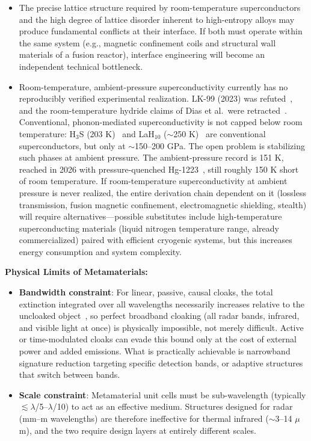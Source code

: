 \documentclass[aps,prd,twocolumn,superscriptaddress,nofootinbib]{revtex4-2}
\begin{document}
\begin{itemize}
  \item The precise lattice structure required by room-temperature superconductors and the high degree of lattice disorder inherent to high-entropy alloys may produce fundamental conflicts at their interface. If both must operate within the same system (e.g., magnetic confinement coils and structural wall materials of a fusion reactor), interface engineering will become an independent technical bottleneck.
  \item Room-temperature, ambient-pressure superconductivity currently has no reproducibly verified experimental realization. LK-99 (2023) was refuted~\cite{Garisto2023}, and the room-temperature hydride claims of Dias et al.\ were retracted~\cite{Snider2022,DasenbrockGammon2023}. Conventional, phonon-mediated superconductivity is not capped below room temperature: H$_{3}$S (203 K)~\cite{Drozdov2015} and LaH$_{10}$ (${\sim}$250 K)~\cite{Drozdov2019} are conventional superconductors, but only at ${\sim}$150--200 GPa. The open problem is stabilizing such phases at ambient pressure. The ambient-pressure record is 151 K, reached in 2026 with pressure-quenched Hg-1223~\cite{Deng2026}, still roughly 150 K short of room temperature. If room-temperature superconductivity at ambient pressure is never realized, the entire derivation chain dependent on it (lossless transmission, fusion magnetic confinement, electromagnetic shielding, stealth) will require alternatives---possible substitutes include high-temperature superconducting materials (liquid nitrogen temperature range, already commercialized) paired with efficient cryogenic systems, but this increases energy consumption and system complexity.
\end{itemize}

\textbf{Physical Limits of Metamaterials:}

\begin{itemize}
  \item \textbf{Bandwidth constraint}: For linear, passive, causal cloaks, the total extinction integrated over all wavelengths necessarily increases relative to the uncloaked object~\cite{Monticone2013}, so perfect broadband cloaking (all radar bands, infrared, and visible light at once) is physically impossible, not merely difficult. Active or time-modulated cloaks can evade this bound only at the cost of external power and added emissions. What is practically achievable is narrowband signature reduction targeting specific detection bands, or adaptive structures that switch between bands.
  \item \textbf{Scale constraint}: Metamaterial unit cells must be sub-wavelength (typically $\lesssim\lambda$/5--$\lambda$/10) to act as an effective medium. Structures designed for radar (mm--m wavelengths) are therefore ineffective for thermal infrared (${\sim}$3--14 $\mu$m), and the two require design layers at entirely different scales.
\end{itemize}
\end{document}
